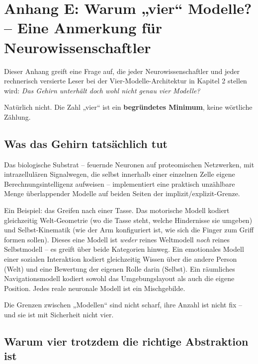 \documentclass[11pt, twoside, openright]{book}
\begin{document}
\chapter*{Anhang E: Warum „vier“ Modelle? -- Eine Anmerkung für Neurowissenschaftler}

Dieser Anhang greift eine Frage auf, die jeder Neurowissenschaftler und jeder rechnerisch versierte Leser bei der Vier-Modelle-Architektur in Kapitel 2 stellen wird: \textit{Das Gehirn unterhält doch wohl nicht genau vier Modelle?}

Natürlich nicht. Die Zahl „vier“ ist ein \textbf{begründetes Minimum}, keine wörtliche Zählung.

\section*{Was das Gehirn tatsächlich tut}

Das biologische Substrat -- feuernde Neuronen auf proteomischen Netzwerken, mit intrazellulären Signalwegen, die selbst innerhalb einer einzelnen Zelle eigene Berechnungsintelligenz aufweisen -- implementiert eine praktisch unzählbare Menge überlappender Modelle auf beiden Seiten der implizit/explizit-Grenze.

Ein Beispiel: das Greifen nach einer Tasse. Das motorische Modell kodiert gleichzeitig Welt-Geometrie (wo die Tasse steht, welche Hindernisse sie umgeben) und Selbst-Kinematik (wie der Arm konfiguriert ist, wie sich die Finger zum Griff formen sollen). Dieses eine Modell ist \textit{weder} reines Weltmodell \textit{noch} reines Selbstmodell -- es greift über beide Kategorien hinweg. Ein emotionales Modell einer sozialen Interaktion kodiert gleichzeitig Wissen über die andere Person (Welt) und eine Bewertung der eigenen Rolle darin (Selbst). Ein räumliches Navigationsmodell kodiert sowohl das Umgebungslayout als auch die eigene Position. Jedes reale neuronale Modell ist ein Mischgebilde.

Die Grenzen zwischen „Modellen“ sind nicht scharf, ihre Anzahl ist nicht fix -- und sie ist mit Sicherheit nicht vier.

\section*{Warum vier trotzdem die richtige Abstraktion ist}
\end{document}
